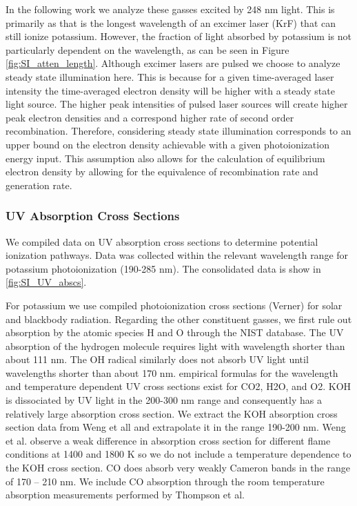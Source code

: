 In the following work we analyze these gasses excited by 248 nm light. This is primarily as that is the longest wavelength of an excimer laser (KrF) that can still ionize potassium. However, the fraction of light absorbed by potassium is not particularly dependent on the wavelength, as can be seen in Figure \ref{fig:SI_atten_length}. Although excimer lasers are pulsed we choose to analyze steady state illumination here. This is because for a given time-averaged laser intensity the time-averaged electron density will be higher with a steady state light source. The higher peak intensities of pulsed laser sources will create higher peak electron densities and a correspond higher rate of second order recombination. Therefore, considering steady state illumination corresponds to an upper bound on the electron density achievable with a given photoionization energy input. This assumption also allows for the calculation of equilibrium electron density by allowing for the equivalence of recombination rate and generation rate.

\subsubsection{UV Absorption Cross Sections}

We compiled data on UV absorption cross sections to determine potential ionization pathways. Data was collected within the relevant wavelength range for potassium photoionization (190-285 nm). The consolidated data is show in \ref{fig:SI_UV_abscs}.  

For potassium we use compiled photoionization cross sections (Verner) for solar and blackbody radiation.\cite{huebnerPhotoionizationPhotodissociationRates2015} Regarding the other constituent gasses, we first rule out absorption by the atomic species H and O through the NIST database.\cite{sansonettiHandbookBasicAtomic2005} The UV absorption of the hydrogen molecule requires light with wavelength shorter than about 111 nm.\cite{franceFARULTRAVIOLETMOLECULARHYDROGEN} The OH radical similarly does not absorb UV light until wavelengths shorter than about 170 nm.\cite{chipmanAbsorptionSpectrumOH2008} empirical formulas for the wavelength and temperature dependent UV cross sections exist for CO2\cite{oehlschlaegerUltravioletAbsorptionCrosssections2004}, H2O,\cite{zuevUVABSORPTIONCROSS} and O2.\cite{zuevUVABSORPTIONCROSS} KOH is dissociated by UV light in the 200-300 nm range and consequently has a relatively large absorption cross section. We extract the KOH absorption cross section data from Weng et all and extrapolate it in the range 190-200 nm.\cite{wengUltravioletAbsorptionCross2019} Weng et al. observe a weak difference in absorption cross section for different flame conditions at 1400 and 1800 K so we do not include a temperature dependence to the KOH cross section. CO does absorb very weakly Cameron bands in the range of 170 -- 210 nm. We include CO absorption through the room temperature absorption measurements performed by Thompson et al.\cite{thompsonUltravioletAbsorptionCoefficients1963}


